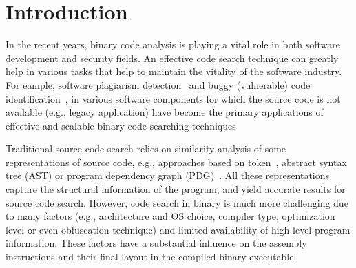 \section{Introduction}

In the recent years, binary code analysis is playing a vital role in both software development and security fields. An effective code search technique can greatly help in various tasks that help to maintain the vitality of the software industry. For eample, software plagiarism detection~\cite{luo2014semantics} and buggy (vulnerable) code identification~\cite{DBLP:conf/sp/PewnyGGRH15, DBLP:conf/pldi/DavidY14}, in various software components for which the source code is not available (e.g., legacy application) have become the primary applications of effective and scalable binary code searching techniques


Traditional source code search relies on similarity analysis of some representations of source code, e.g., approaches based on token~\cite{DBLP:journals/tse/KamiyaKI02}, abstract syntax tree (AST) \cite{DBLP:conf/icse/JiangMSG07} or program dependency graph (PDG)~\cite{DBLP:conf/icse/GabelJS08}. All these representations capture the structural information of the program, and yield accurate results for source code search. However, code search in binary is much more challenging due to many factors (e.g., architecture and OS choice, compiler type, optimization level or even obfuscation technique) and limited availability of high-level program information. These factors have a substantial influence on the assembly instructions and their final layout in the compiled binary executable.

